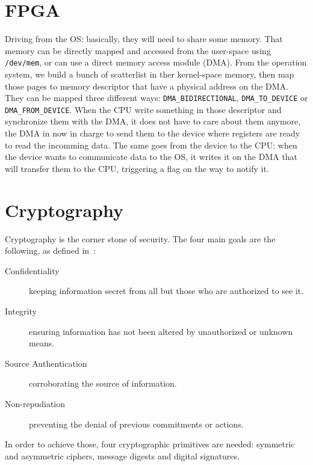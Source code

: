 \section{FPGA}

Driving from the OS: basically, they will need to share some memory.
That memory can be directly mapped and accessed from the user-space using \texttt{/dev/mem}, or can use a direct memory access module (DMA).
From the operation system, we build a bunch of scatterlist in ther kernel-space memory, then map those pages to memory descriptor that have a physical address on the DMA.
They can be mapped three different ways: \texttt{DMA\_BIDIRECTIONAL}, \texttt{DMA\_TO\_DEVICE} or \texttt{DMA\_FROM\_DEVICE}.
When the CPU write something in those descriptor and synchronize them with the DMA, it does not have to care about them anymore, the DMA in now in charge to send them to the device where registers are ready to read the incomming data.
The same goes from the device to the CPU: when the device wants to communicate data to the OS, it writes it on the DMA that will transfer them to the CPU, triggering a flag on the way to notify it.




\section{Cryptography}

Cryptography is the corner stone of security.
The four main goals are the following, as defined in~\cite{Menezes1996}:
\begin{description}
	\item[Confidentiality] keeping information secret from all but those who are authorized to see it.
	\item[Integrity] ensuring information has not been altered by unauthorized or unknown means.
	\item[Source Authentication] corroborating the source of information.
	\item[Non-repudiation] preventing the denial of previous commitments or actions.
\end{description}

In order to achieve those, four cryptographic primitives are needed: symmetric and asymmetric ciphers, message digests and digital signatures.




